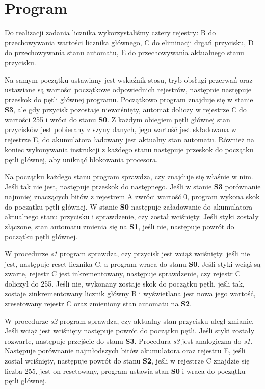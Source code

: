 \documentclass[fleqn]{article}
\begin{document}
\section{Program}
Do realizacji zadania licznika wykorzystaliśmy cztery rejestry: B do przechowywania wartości licznika głównego, C do eliminacji drgań przycisku, D do przechowywania stanu automatu, E do przechowywania aktualnego stanu przycisku.

Na samym początku ustawiany jest wskaźnik stosu, tryb obsługi przerwań oraz ustawiane są wartości początkowe odpowiednich rejestrów, następnie następuje  przeskok do pętli głównej programu. Początkowo program znajduje się w stanie \textbf{S3}, ale gdy przycisk pozostaje niewciśnięty,  automat doliczy w rejestrze C do wartości 255 i wróci do stanu \textbf{S0}. Z każdym obiegiem pętli głównej stan przycisków jest pobierany z szyny danych, jego wartość jest składowana w rejestrze E, do akumulatora ładowany jest aktualny stan automatu. Również na koniec wykonywania instrukcji z każdego stanu następuje przeskok do początku pętli głównej, aby uniknąć blokowania procesora.

Na początku każdego stanu program sprawdza, czy znajduje się właśnie w nim. Jeśli tak nie jest, następuje przeskok do następnego. Jeśli w stanie \textbf{S3} porównanie najmniej znaczących bitów z rejestrem A zwróci wartość 0, program wykona skok do początku pętli głównej. W stanie \textbf{S0} następuje załadowanie do akumulatora aktualnego stanu przycisku i sprawdzenie, czy został wciśnięty. Jeśli styki zostały złączone, stan automatu zmienia się na \textbf{S1}, jeśli nie, następuje powrót do początku pętli głównej.

W procedurze \textit{s1} program sprawdza, czy przycisk jest wciąż wciśnięty. jeśli nie jest, następuje reset licznika C, a program wraca do stanu \textbf{S0}. Jeśli styki wciąż są zwarte, rejestr C jest inkrementowany, następuje sprawdzenie, czy rejestr C doliczył do 255. Jeśli nie, wykonany zostaje skok do początku pętli, jeśli tak, zostaje zinkrementowany licznik główny B i wyświetlana jest nowa jego wartość, zresetowany rejestr C oraz zmieniony stan automatu na \textbf{S2}.

W procedurze \textit{s2} program sprawdza, czy aktualny stan przycisku uległ zmianie. Jeśli wciąż jest wciśnięty następuje powrót do początku pętli. Jeśli styki zostały rozwarte, następuje przejście do stanu \textbf{S3}. Procedura \textit{s3} jest analogiczna do \textit{s1}. Następuje porównanie najmłodszych bitów akumulatora oraz rejestru E, jeśli został wciśnięty, następuje powrót do stanu \textbf{S2}, jeśli w rejestrze C znajdzie się liczba 255, jest on resetowany, program ustawia stan \textbf{S0} i wraca do początku pętli głównej.
\end{document}
